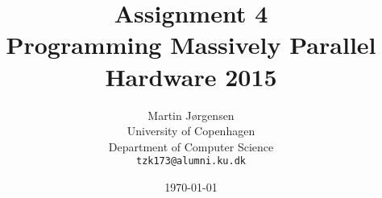 \documentclass[a4paper,11pt]{article}
\title{\textbf{Assignment 4} \\ Programming Massively Parallel Hardware 2015}
\author
{
    Martin Jørgensen \\
    University of Copenhagen \\
    Department of Computer Science \\
    {\tt tzk173@alumni.ku.dk}
}
\date{\today}
\begin{document}
\maketitle

\tableofcontents
\pagebreak


%



\appendix


\end{document}
